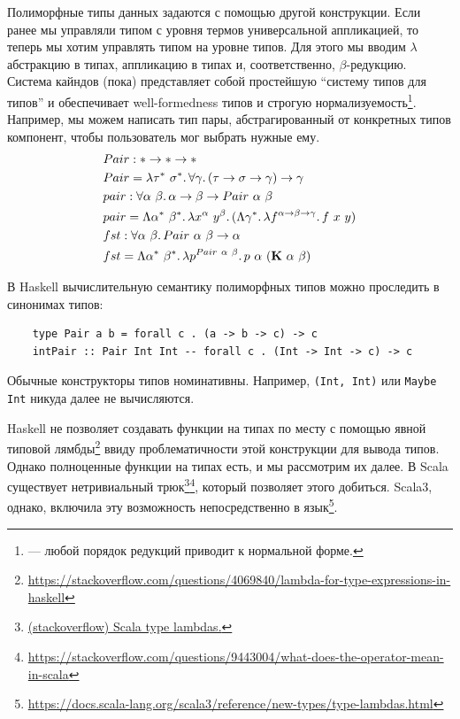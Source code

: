 Полиморфные типы данных задаются с помощью другой конструкции.
Если ранее мы управляли типом с уровня термов универсальной аппликацией, то теперь мы хотим управлять типом на уровне типов.
Для этого мы вводим $\lambda$ абстракцию в типах, аппликацию в типах и, соответственно, $\beta$-редукцию.
Система кайндов (пока) представляет собой простейшую ``систему типов для типов'' и обеспечивает well-formedness типов и строгую нормализуемость\footnote{ --- любой порядок редукций приводит к нормальной форме.}.
Например, мы можем написать тип пары, абстрагированный от конкретных типов компонент, чтобы пользователь мог выбрать нужные ему.
\begin{align*}
    &Pair : * \rightarrow * \rightarrow * \\
    &Pair = \lambda \tau^*~\sigma^*\ldotp\forall \gamma\ldotp(\tau\rightarrow\sigma\rightarrow\gamma)\to\gamma \\
    &pair : \forall \alpha~\beta\ldotp\alpha \rightarrow \beta \rightarrow Pair~\alpha~\beta \\
    &pair = \Lambda \alpha^*~\beta^*\ldotp\lambda x^\alpha~y^\beta\ldotp(\Lambda \gamma^*\ldotp\lambda f^{\alpha\rightarrow\beta\rightarrow\gamma}\ldotp f~x~y) \\
    &fst : \forall \alpha~\beta\ldotp Pair~\alpha~\beta\rightarrow \alpha \\
    &fst = \Lambda \alpha^*~\beta^*\ldotp\lambda p^{Pair~\alpha~\beta}\ldotp p~\alpha~(\mathbf{K}~\alpha~\beta)
\end{align*}

В Haskell вычислительную семантику полиморфных типов можно проследить в синонимах типов:
\begin{verbatim}
    type Pair a b = forall c . (a -> b -> c) -> c
    intPair :: Pair Int Int -- forall c . (Int -> Int -> c) -> c
\end{verbatim}
Обычные конструкторы типов номинативны.
Например, \texttt{(Int, Int)} или \texttt{Maybe Int} никуда далее не вычисляются.

Haskell не позволяет создавать функции на типах по месту с помощью явной типовой лямбды\footnote{\url{https://stackoverflow.com/questions/4069840/lambda-for-type-expressions-in-haskell}} ввиду проблематичности этой конструкции для вывода типов. %
Однако полноценные функции на типах есть, и мы рассмотрим их далее. %
В Scala существует нетривиальный трюк\footnote{\href{https://stackoverflow.com/questions/8736164/what-are-type-lambdas-in-scala-and-what-are-their-benefits}{(stackoverflow) Scala type lambdas.}}\footnote{\url{https://stackoverflow.com/questions/9443004/what-does-the-operator-mean-in-scala}}, который позволяет этого добиться.
Scala3, однако, включила эту возможность непосредственно в язык\footnote{\url{https://docs.scala-lang.org/scala3/reference/new-types/type-lambdas.html}}.

